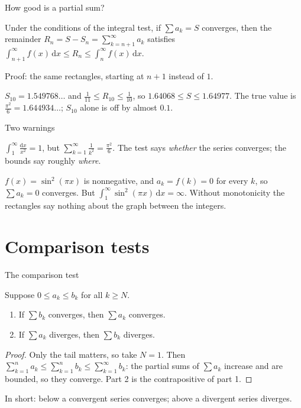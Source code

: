 \documentclass[10pt]{wosm-slides}
\newcommand{\dx}{\,\mathrm{d}x}
\begin{document}
\begin{frame}{How good is a partial sum?}
  \begin{theorem}
    Under the conditions of the integral test, if $\sum a_k = S$ converges, then the
    remainder $R_n = S - S_n = \sum_{k=n+1}^\infty a_k$ satisfies
    $\int_{n+1}^{\infty} f(x)\dx \le R_n \le \int_n^\infty f(x)\dx$.
  \end{theorem}
  {\small Proof: the same rectangles, starting at $n + 1$ instead of $1$.\par}
  \pause
  \begin{example}[$\sum \frac{1}{k^2}$ with $n = 10$]
    $S_{10} = 1.549768\ldots$ and $\frac{1}{11} \le R_{10} \le \frac{1}{10}$, so
    $1.64068 \le S \le 1.64977$. The true value is $\frac{\pi^2}{6} = 1.644934\ldots$;
    $S_{10}$ alone is off by almost $0.1$.
  \end{example}
\end{frame}

\begin{frame}{Two warnings}
  \begin{warning}
    $\int_1^\infty \frac{\mathrm{d}x}{x^2} = 1$, but $\sum_{k=1}^\infty \frac{1}{k^2} = \frac{\pi^2}{6}$.
    The test says \emph{whether} the series converges; the bounds say roughly \emph{where}.
  \end{warning}
  \pause
  \begin{warning}
    $f(x) = \sin^2(\pi x)$ is nonnegative, and $a_k = f(k) = 0$ for every $k$,
    so $\sum a_k = 0$ converges. But $\int_1^\infty \sin^2(\pi x)\dx = \infty$.
    Without monotonicity the rectangles say nothing about the graph between the integers.
  \end{warning}
\end{frame}

\section{Comparison tests}

\begin{frame}{The comparison test}
  \begin{theorem}
    Suppose $0 \le a_k \le b_k$ for all $k \ge N$.
    \begin{enumerate}
      \item If $\sum b_k$ converges, then $\sum a_k$ converges.
      \item If $\sum a_k$ diverges, then $\sum b_k$ diverges.
    \end{enumerate}
  \end{theorem}
  \pause
  \begin{proof}
    Only the tail matters, so take $N = 1$. Then
    $\sum_{k=1}^n a_k \le \sum_{k=1}^n b_k \le \sum_{k=1}^\infty b_k$:
    the partial sums of $\sum a_k$ increase and are bounded, so they converge.
    Part 2 is the contrapositive of part 1.
  \end{proof}
  In short: below a convergent series converges; above a divergent series diverges.
\end{frame}
\end{document}
